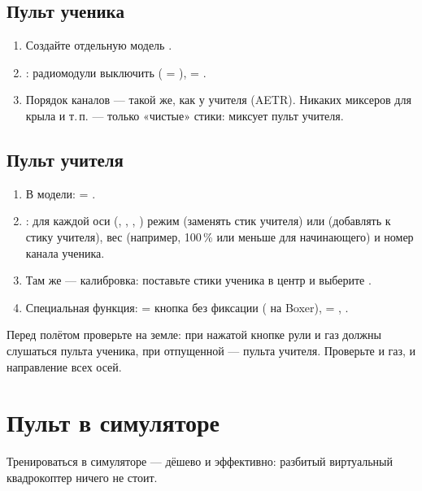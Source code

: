 \subsection{Пульт ученика}

\begin{enumerate}
  \item Создайте отдельную модель .
  \item {}: радиомодули выключить ( = ),
         = .
  \item Порядок каналов --- такой же, как у учителя (AETR). Никаких миксеров для крыла и т.\,п. ---
        только «чистые» стики: миксует пульт учителя.
\end{enumerate}

\subsection{Пульт учителя}

\begin{enumerate}
  \item В модели:  = .
  \item {}: для каждой оси (, , , ) режим
        \menu{:=} (заменять стик учителя) или \menu{+=} (добавлять к стику учителя), вес
        (например, 100\,\% или меньше для начинающего) и номер канала ученика.
  \item Там же --- калибровка: поставьте стики ученика в центр и выберите .
  \item Специальная функция:  = кнопка без фиксации ( на Boxer),
         = , .
\end{enumerate}

\begin{caution}
Перед полётом проверьте на земле: при нажатой кнопке рули и газ должны слушаться
пульта ученика, при отпущенной --- пульта учителя. Проверьте и газ, и направление всех осей.
\end{caution}

\section{Пульт в симуляторе}

Тренироваться в симуляторе --- дёшево и эффективно: разбитый виртуальный квадрокоптер
ничего не стоит.

